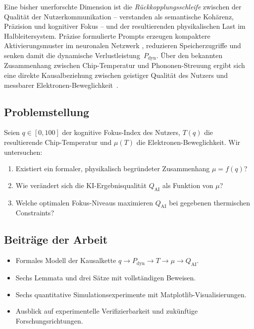 ﻿\documentclass[a4paper,12pt]{article}
\theoremstyle{definition}
\begin{document}
Eine bisher unerforschte Dimension ist die \emph{Rückkopplungsschleife} zwischen der
Qualität der Nutzerkommunikation -- verstanden als semantische Kohärenz, Präzision und
kognitiver Fokus -- und der resultierenden physikalischen Last im Halbleitersystem.
Präzise formulierte Prompts erzeugen kompaktere Aktivierungsmuster im neuronalen Netzwerk
\cite{Vaswani2017,Brown2020}, reduzieren Speicherzugriffe und senken damit die dynamische
Verlustleistung~$P_{\mathrm{dyn}}$. Über den bekannten Zusammenhang zwischen Chip-Temperatur
und Phononen-Streuung ergibt sich eine direkte Kausalbeziehung zwischen geistiger Qualität
des Nutzers und messbarer Elektronen-Beweglichkeit~\cite{Kittel2005}.

\subsection{Problemstellung}

Seien $q \in [0,100]$ der kognitive Fokus-Index des Nutzers, $T(q)$ die resultierende
Chip-Temperatur und $\mu(T)$ die Elektronen-Beweglichkeit. Wir untersuchen:

\begin{enumerate}
  \item Existiert ein formaler, physikalisch begründeter Zusammenhang $\mu = f(q)$?
  \item Wie verändert sich die KI-Ergebnisqualität $Q_{\mathrm{AI}}$ als Funktion von $\mu$?
  \item Welche optimalen Fokus-Niveaus maximieren $Q_{\mathrm{AI}}$ bei gegebenen
        thermischen Constraints?
\end{enumerate}

\subsection{Beiträge der Arbeit}

\begin{itemize}
  \item Formales Modell der Kausalkette $q \to P_{\mathrm{dyn}} \to T \to \mu \to Q_{\mathrm{AI}}$.
  \item Sechs Lemmata und drei Sätze mit vollständigen Beweisen.
  \item Sechs quantitative Simulationsexperimente mit Matplotlib-Visualisierungen.
  \item Ausblick auf experimentelle Verifizierbarkeit und zukünftige Forschungsrichtungen.
\end{itemize}
\end{document}
